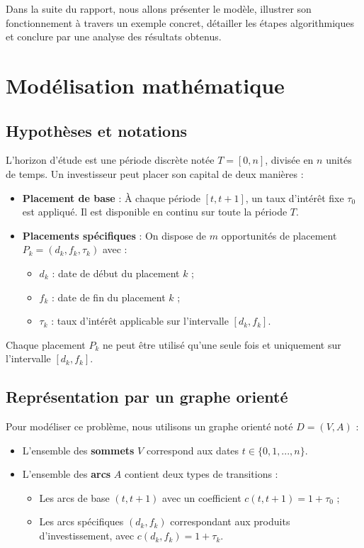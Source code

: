 \documentclass[a4paper,11pt]{article}
\begin{document}
    Dans la suite du rapport, nous allons présenter le modèle, illustrer son fonctionnement à travers un exemple concret, détailler les étapes algorithmiques et conclure par une analyse des résultats obtenus.


    

    \section{Modélisation mathématique}
    \subsection{Hypothèses et notations}

    L’horizon d’étude est une période discrète notée $T = [0, n]$, divisée en $n$ unités de temps. Un investisseur peut placer son capital de deux manières :
    \begin{itemize}
        \item \textbf{Placement de base} : À chaque période $[t, t+1]$, un taux d’intérêt fixe $\tau_0$ est appliqué. Il est disponible en continu sur toute la période $T$.
        \item \textbf{Placements spécifiques} : On dispose de $m$ opportunités de placement $P_k = (d_k, f_k, \tau_k)$ avec :
        \begin{itemize}
            \item $d_k$ : date de début du placement $k$ ;
            \item $f_k$ : date de fin du placement $k$ ;
            \item $\tau_k$ : taux d’intérêt applicable sur l’intervalle $[d_k, f_k]$.
        \end{itemize}
    \end{itemize}

    Chaque placement $P_k$ ne peut être utilisé qu’une seule fois et uniquement sur l’intervalle $[d_k, f_k]$.
    

    \subsection{Représentation par un graphe orienté}

    Pour modéliser ce problème, nous utilisons un graphe orienté noté $D = (V, A)$ :

    \begin{itemize}
        \item L’ensemble des \textbf{sommets} $V$ correspond aux dates $t \in \{0, 1, ..., n\}$.
        \item L’ensemble des \textbf{arcs} $A$ contient deux types de transitions :
        \begin{itemize}
            \item Les arcs de base $(t, t+1)$ avec un coefficient $c(t, t+1) = 1 + \tau_0$ ;
            \item Les arcs spécifiques $(d_k, f_k)$ correspondant aux produits d’investissement, avec $c(d_k, f_k) = 1 + \tau_k$.
        \end{itemize}
    \end{itemize}
\end{document}
